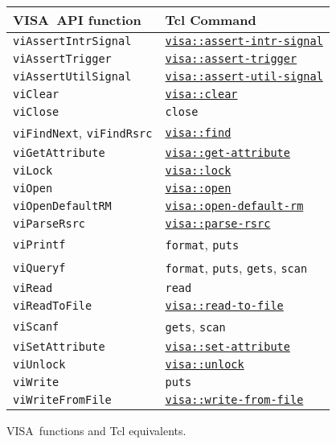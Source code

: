\documentclass[12pt, a4paper]{report}
\newcommand{\VISA}{\mbox{VISA }}
\newcommand{\COMMANDREF}[1]{{\tt \hyperref[#1]{#1}}}
\newcommand{\VISACOMMANDREF}[1]{{\tt \mbox{#1}}\index{#1}}
\newcommand{\TCLCOMMANDREF}[1]{{\tt \mbox{#1}}\index{#1}}
\begin{document}
\begin{figure}
\caption{\VISA functions and Tcl equivalents.}
\label{tabCorrespondence}
\medskip
\begin{tabular}{ll}
\VISA API function & Tcl Command \\
\hline
\VISACOMMANDREF{viAssertIntrSignal} & \COMMANDREF{visa::assert-intr-signal}	\\
\VISACOMMANDREF{viAssertTrigger} & \COMMANDREF{visa::assert-trigger}	\\
\VISACOMMANDREF{viAssertUtilSignal} & \COMMANDREF{visa::assert-util-signal}	\\
\VISACOMMANDREF{viClear} & \COMMANDREF{visa::clear}	\\
\VISACOMMANDREF{viClose} & \TCLCOMMANDREF{close}	\\
\VISACOMMANDREF{viFindNext}, \VISACOMMANDREF{viFindRsrc} & \COMMANDREF{visa::find}	\\
\VISACOMMANDREF{viGetAttribute} & \COMMANDREF{visa::get-attribute}	\\
\VISACOMMANDREF{viLock} & \COMMANDREF{visa::lock}	\\
\VISACOMMANDREF{viOpen} & \COMMANDREF{visa::open}	\\
\VISACOMMANDREF{viOpenDefaultRM} & \COMMANDREF{visa::open-default-rm}	\\
\VISACOMMANDREF{viParseRsrc} & \COMMANDREF{visa::parse-rsrc}	\\
\VISACOMMANDREF{viPrintf} & \TCLCOMMANDREF{format}, \TCLCOMMANDREF{puts}	\\
\VISACOMMANDREF{viQueryf} & \TCLCOMMANDREF{format}, \TCLCOMMANDREF{puts}, \TCLCOMMANDREF{gets}, \TCLCOMMANDREF{scan}	\\
\VISACOMMANDREF{viRead} & \TCLCOMMANDREF{read}	\\
\VISACOMMANDREF{viReadToFile} & \COMMANDREF{visa::read-to-file}	\\
\VISACOMMANDREF{viScanf} & \TCLCOMMANDREF{gets}, \TCLCOMMANDREF{scan}	\\
\VISACOMMANDREF{viSetAttribute} & \COMMANDREF{visa::set-attribute}	\\
\VISACOMMANDREF{viUnlock} & \COMMANDREF{visa::unlock}	\\
\VISACOMMANDREF{viWrite} & \TCLCOMMANDREF{puts}	\\
\VISACOMMANDREF{viWriteFromFile} & \COMMANDREF{visa::write-from-file}	\\
\end{tabular}
\end{figure}
\end{document}

